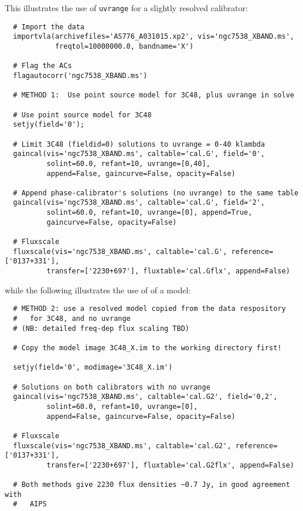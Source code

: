 This illustrates the use of {\tt uvrange} for a slightly resolved 
calibrator:
\small
\begin{verbatim}
  # Import the data
  importvla(archivefiles='AS776_A031015.xp2', vis='ngc7538_XBAND.ms',
            freqtol=10000000.0, bandname='X')

  # Flag the ACs
  flagautocorr('ngc7538_XBAND.ms')

  # METHOD 1:  Use point source model for 3C48, plus uvrange in solve

  # Use point source model for 3C48
  setjy(field='0');

  # Limit 3C48 (fieldid=0) solutions to uvrange = 0-40 klambda
  gaincal(vis='ngc7538_XBAND.ms', caltable='cal.G', field='0',
          solint=60.0, refant=10, uvrange=[0,40], 
          append=False, gaincurve=False, opacity=False)

  # Append phase-calibrator's solutions (no uvrange) to the same table
  gaincal(vis='ngc7538_XBAND.ms', caltable='cal.G', field='2', 
          solint=60.0, refant=10, uvrange=[0], append=True,
          gaincurve=False, opacity=False)

  # Fluxscale
  fluxscale(vis='ngc7538_XBAND.ms', caltable='cal.G', reference=['0137+331'],
          transfer=['2230+697'], fluxtable='cal.Gflx', append=False)
\end{verbatim}
\normalsize
while the following illustrates the use of of a model:
\small
\begin{verbatim}
  # METHOD 2: use a resolved model copied from the data respository
  #   for 3C48, and no uvrange
  # (NB: detailed freq-dep flux scaling TBD)

  # Copy the model image 3C48_X.im to the working directory first!

  setjy(field='0', modimage='3C48_X.im')

  # Solutions on both calibrators with no uvrange
  gaincal(vis='ngc7538_XBAND.ms', caltable='cal.G2', field='0,2',
          solint=60.0, refant=10, uvrange=[0], 
          append=False, gaincurve=False, opacity=False)

  # Fluxscale
  fluxscale(vis='ngc7538_XBAND.ms', caltable='cal.G2', reference=['0137+331'],
          transfer=['2230+697'], fluxtable='cal.G2flx', append=False)

  # Both methods give 2230 flux densities ~0.7 Jy, in good agreement with
  #   AIPS
\end{verbatim}
\normalsize


